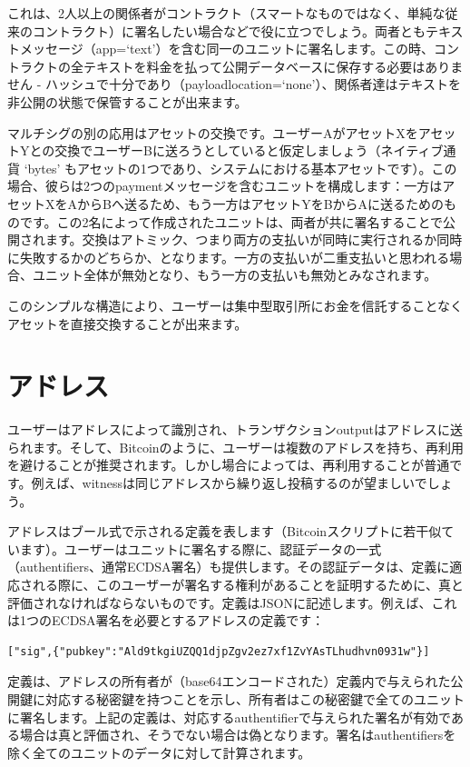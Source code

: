 \documentclass[a4paper, dvipdfmx]{jsarticle}
\begin{document}
これは、2人以上の関係者がコントラクト（スマートなものではなく、単純な従来のコントラクト）に署名したい場合などで役に立つでしょう。両者ともテキストメッセージ（app=`text'）を含む同一のユニットに署名します。この時、コントラクトの全テキストを料金を払って公開データベースに保存する必要はありません - ハッシュで十分であり（payload\textunderscore location=`none'）、関係者達はテキストを非公開の状態で保管することが出来ます。

マルチシグの別の応用はアセットの交換です。ユーザーAがアセットXをアセットYとの交換でユーザーBに送ろうとしていると仮定しましょう（ネイティブ通貨 `bytes' もアセットの1つであり、システムにおける基本アセットです）。この場合、彼らは2つのpaymentメッセージを含むユニットを構成します：一方はアセットXをAからBへ送るため、もう一方はアセットYをBからAに送るためのものです。この2名によって作成されたユニットは、両者が共に署名することで公開されます。交換はアトミック、つまり両方の支払いが同時に実行されるか同時に失敗するかのどちらか、となります。一方の支払いが二重支払いと思われる場合、ユニット全体が無効となり、もう一方の支払いも無効とみなされます。

このシンプルな構造により、ユーザーは集中型取引所にお金を信託することなくアセットを直接交換することが出来ます。

\section{アドレス}

ユーザーはアドレスによって識別され、トランザクションoutputはアドレスに送られます。そして、Bitcoinのように、ユーザーは複数のアドレスを持ち、再利用を避けることが推奨されます。しかし場合によっては、再利用することが普通です。例えば、witnessは同じアドレスから繰り返し投稿するのが望ましいでしょう。

アドレスはブール式で示される定義を表します（Bitcoinスクリプトに若干似ています）。ユーザーはユニットに署名する際に、認証データの一式（authentifiers、通常ECDSA署名）も提供します。その認証データは、定義に適応される際に、このユーザーが署名する権利があることを証明するために、真と評価されなければならないものです。定義はJSONに記述します。例えば、これは1つのECDSA署名を必要とするアドレスの定義です：

\begin{lstlisting}[basicstyle=\ttfamily\footnotesize, frame=none]
["sig",{"pubkey":"Ald9tkgiUZQQ1djpZgv2ez7xf1ZvYAsTLhudhvn0931w"}]
\end{lstlisting}

\noindent 定義は、アドレスの所有者が（base64エンコードされた）定義内で与えられた公開鍵に対応する秘密鍵を持つことを示し、所有者はこの秘密鍵で全てのユニットに署名します。上記の定義は、対応するauthentifierで与えられた署名が有効である場合は真と評価され、そうでない場合は偽となります。署名はauthentifiersを除く全てのユニットのデータに対して計算されます。
\end{document}
